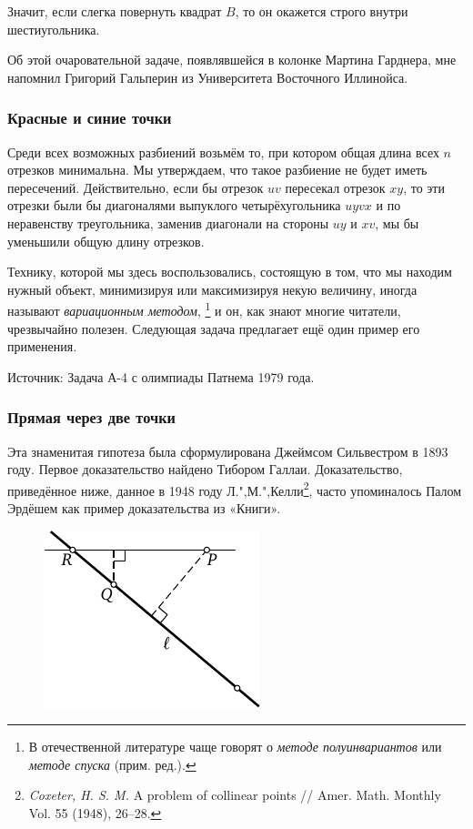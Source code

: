 \documentclass[twoside]{book}
\begin{document}
Значит, если слегка повернуть квадрат $B$, то он окажется строго внутри шестиугольника.\heart

Об этой очаровательной задаче, появлявшейся в колонке Мартина Гарднера, мне напомнил Григорий Гальперин из Университета Восточного Иллинойса.

\subsubsection*{Красные и синие точки}%

Среди всех возможных разбиений возьмём то, при котором общая длина всех $n$ отрезков минимальна.
Мы утверждаем, что такое разбиение не будет иметь пересечений.
Действительно, если бы отрезок $uv$ пересекал отрезок $xy$, то эти отрезки были бы диагоналями выпуклого четырёхугольника $uyvx$ %
и по неравенству треугольника, заменив диагонали на стороны $uy$ и $xv$, мы бы уменьшили общую длину отрезков.
\heart

Технику, которой мы здесь воспользовались, состоящую в том, что мы находим нужный объект, минимизируя или максимизируя некую величину, иногда называют \emph{вариационным методом},%
\footnote{В отечественной литературе чаще говорят о \emph{методе полуинвариантов} или \emph{методе спуска} (прим. ред.).}
и он, как знают многие читатели, чрезвычайно полезен.
Следующая задача предлагает ещё один пример его применения.

\medskip
{\small 
Источник: Задача А-4 с олимпиады Патнема 1979 года.

}


\subsubsection*{Прямая через две точки}%

Эта знаменитая гипотеза была сформулирована Джеймсом Сильвестром в 1893 году.
Первое доказательство найдено Тибором Галлаи. %
Доказательство, приведённое ниже, данное в 1948 году Л.",М.",Келли\footnote{
\emph{Coxeter, H. S. M.} A problem of collinear points /\!/ {Amer. Math. Monthly} Vol. 55 (1948), 26--28.}, 
часто упоминалось Палом Эрдёшем как пример доказательства из «Книги».

\begin{figure}[ht!]
\centering
\includegraphics[scale=1.3]{mp/wink-12}
\end{figure}
\end{document}
